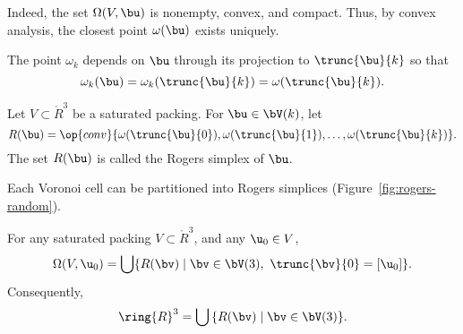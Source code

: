 \figHFFTUNW %

  Indeed,
the set $\Omega(V, \bu)$ is nonempty, convex, and compact.  Thus, by
convex analysis, the closest point $\omega( \bu)$ exists uniquely.

The point $\omega_k$ depends on $\bu$ through its projection to
$\trunc{\bu}{k}$ so that
\[
\omega_k(\bu) = \omega_k(\trunc{\bu}{k})=\omega(\trunc{\bu}{k}).
\]
%

\begin{definition} 
Let $V\subset\ring{R}^3$ be a saturated packing. For $\bu\in \bV(k)$, let 
\[
 R(\bu) = \op{conv}\{\omega( \trunc{\bu}{0}), \omega(
 \trunc{\bu}{1}),\ldots,\omega( \trunc{\bu}{k})\}.
\]
The set $R(\bu)$ is called the Rogers simplex of $\bu$.
%
\end{definition}

Each Voronoi cell can be partitioned into Rogers simplices (Figure~\ref{fig:rogers-random}).

\figBUGZBTW %

\begin{lemma} 
\label{lemma:Rogers-d}
For any saturated packing $V\subset\ring{R}^3$, and any $\u_0\in V$,
\begin{equation} 
\Omega(V,\u_0) = \bigcup \{ R(\bv) \mid \bv\in \bV(3),~\trunc{\bv}{0} =[\u_0]\}.
\end{equation}
Consequently,
\[ 
\ring{R}^3 = \bigcup\, \{ R(\bv) \mid \bv\in\bV(3)\}.
\] 
\end{lemma}

